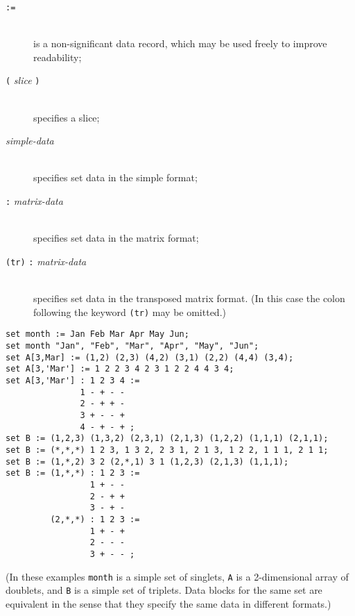 \documentclass[11pt]{report}
\def\para#1{\noindent{\bf#1}}
\begin{document}
\vspace*{-8pt}

\begin{description}
\item[{\tt :=}]\hspace*{0pt}\\
is a non-significant data record, which may be used freely to improve
readability;
\item[{\tt(} {\it slice} {\tt)}]\hspace*{0pt}\\
specifies a slice;
\item[{\it simple-data}]\hspace*{0pt}\\
specifies set data in the simple format;
\item[{\tt:} {\it matrix-data}]\hspace*{0pt}\\
specifies set data in the matrix format;
\item[{\tt(tr)} {\tt:} {\it matrix-data}]\hspace*{0pt}\\
specifies set data in the transposed matrix format. (In this case the
colon following the keyword {\tt(tr)} may be omitted.)
\end{description}

\vspace*{-8pt}

\para{Examples}

\begin{verbatim}
set month := Jan Feb Mar Apr May Jun;
set month "Jan", "Feb", "Mar", "Apr", "May", "Jun";
set A[3,Mar] := (1,2) (2,3) (4,2) (3,1) (2,2) (4,4) (3,4);
set A[3,'Mar'] := 1 2 2 3 4 2 3 1 2 2 4 4 3 4;
set A[3,'Mar'] : 1 2 3 4 :=
               1 - + - -
               2 - + + -
               3 + - - +
               4 - + - + ;
set B := (1,2,3) (1,3,2) (2,3,1) (2,1,3) (1,2,2) (1,1,1) (2,1,1);
set B := (*,*,*) 1 2 3, 1 3 2, 2 3 1, 2 1 3, 1 2 2, 1 1 1, 2 1 1;
set B := (1,*,2) 3 2 (2,*,1) 3 1 (1,2,3) (2,1,3) (1,1,1);
set B := (1,*,*) : 1 2 3 :=
                 1 + - -
                 2 - + +
                 3 - + -
         (2,*,*) : 1 2 3 :=
                 1 + - +
                 2 - - -
                 3 + - - ;
\end{verbatim}

\noindent(In these examples {\tt month} is a simple set of singlets,
{\tt A} is a 2-dimensional array of doublets, and {\tt B} is a simple
set of triplets. Data blocks for the same set are equivalent in the
sense that they specify the same data in different formats.)
\end{document}
